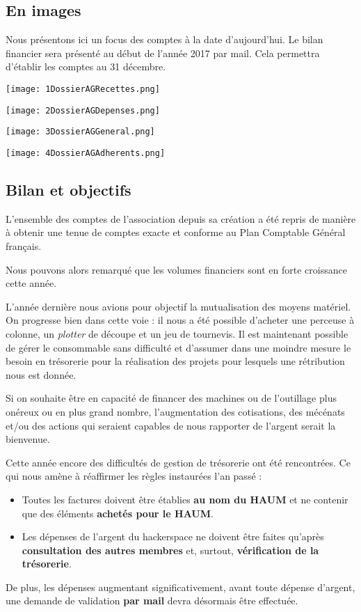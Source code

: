 \documentclass[11pt]{article}
\begin{document}
\subsection{En images}
Nous présentons ici un focus des comptes à la date d'aujourd'hui. Le bilan financier
sera présenté au début de l'année 2017 par mail. Cela permettra d'établir les comptes
au 31 décembre.
\begin{center}
\begin{multicols}{2}
\texttt{[image: 1DossierAGRecettes.png]}

\texttt{[image: 2DossierAGDepenses.png]}
\end{multicols}

\begin{multicols}{2}
\texttt{[image: 3DossierAGGeneral.png]}

\texttt{[image: 4DossierAGAdherents.png]}
\end{multicols}
\end{center}
\subsection{Bilan et objectifs}
L'ensemble des comptes de l'association depuis sa création a été repris de manière
à obtenir une tenue de comptes exacte et conforme au Plan Comptable Général français.

Nous pouvons alors remarqué que les volumes financiers sont en forte croissance
cette année.

L'année dernière nous avions pour objectif la mutualisation des moyens matériel.
On progresse bien dans cette voie : il nous a été possible d'acheter une perceuse à
colonne, un \textit{plotter} de découpe et un jeu de tournevis.
Il est maintenant possible de gérer le consommable sans difficulté et d'assumer dans
une moindre mesure le besoin en trésorerie pour la réalisation des projets pour lesquels
une rétribution nous est donnée.

Si on souhaite être en capacité de financer des machines ou de l'outillage plus onéreux
ou en plus grand nombre, l'augmentation des cotisations, des mécénats et/ou des
actions qui seraient capables de nous rapporter de l'argent serait la bienvenue.

\bigskip

Cette année encore des difficultés de gestion de trésorerie ont été rencontrées. Ce qui
nous amène à réaffirmer les règles instaurées l'an passé :
\begin{itemize}
 \item Toutes les factures doivent être établies \textbf{au nom du HAUM} et ne
 contenir que des éléments \textbf{achetés pour le HAUM}.
 \item Les dépenses de l'argent du hackerspace ne doivent être faites qu'après
 \textbf{consultation des autres membres} et, surtout, \textbf{vérification de la
 trésorerie}.
\end{itemize}
De plus, les dépenses augmentant significativement, avant toute dépense d'argent, une
demande de validation \textbf{par mail} devra désormais être effectuée.
\end{document}
